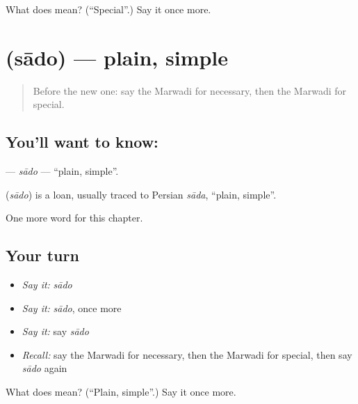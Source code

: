 \begin{tcolorbox}[breakable,colback=teal!4,colframe=teal!35!black,title={Before you move on}]
What does  mean? (\textquotedblleft{}Special\textquotedblright{}.) Say it once more.
\end{tcolorbox}
\section[\texorpdfstring{\mw{सादो} (sādo)}{सादो (sādo)}]{ (sādo) — plain, simple}

\label{lesson:MW-C148-sado}



\begin{quote}
Before the new one: say the Marwadi for necessary, then the Marwadi for special.
\end{quote}

\subsection*{You'll want to know: }
\textbf{} — \emph{sādo} — \textquotedblleft{}plain, simple\textquotedblright{}.

\begin{cousinweb}
\textbf{} (\emph{sādo}) is a loan, usually traced to Persian \emph{sāda}, \textquotedblleft{}plain, simple\textquotedblright{}.
\end{cousinweb}

\begin{grammarlens}[title={What you've built}]
One more word for this chapter.
\end{grammarlens}

\subsection*{Your turn}
\begin{itemize}
\raggedright
  \item \emph{Say it:} \emph{sādo}
  \item \emph{Say it:} \emph{sādo}, once more
  \item \emph{Say it:} say \emph{sādo}
  \item \emph{Recall:} say the Marwadi for necessary, then the Marwadi for special, then say \emph{sādo} again
\end{itemize}

\begin{tcolorbox}[breakable,colback=teal!4,colframe=teal!35!black,title={Before you move on}]
What does  mean? (\textquotedblleft{}Plain, simple\textquotedblright{}.) Say it once more.
\end{tcolorbox}
